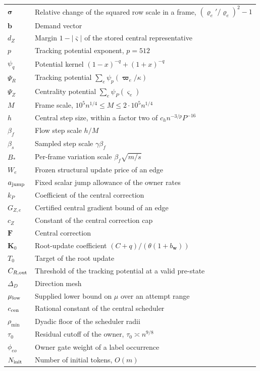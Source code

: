 \documentclass[11pt]{article}
\theoremstyle{remark}
\newcommand{\bb}{\mathbf b}
\newcommand{\ww}{\mathbf w}
\newcommand{\vvs}{\boldsymbol{\varsigma}}
\newcommand{\vvsbar}{\overline{\boldsymbol{\varsigma}}}
\newcommand{\vvr}{\boldsymbol{\varrho}}
\newcommand{\vvp}{\boldsymbol{\varpi}}
\newcommand{\ssigma}{\boldsymbol{\sigma}}
\newcommand{\FF}{\mathbf F}
\newcommand{\KK}{\mathbf K}
\begin{document}
\begin{longtable}{@{}p{}p{}@{}}
$\ssigma$ & Relative change of the squared row scale in a frame, $(\vvr_e'/\vvr_e)^2-1$ \\
$\bb$ & Demand vector \\
$d_Z$ & Margin $1-|\vvsbar|$ of the stored central representative \\
$p$ & Tracking potential exponent, $p=512$ \\
$\psi_q$ & Potential kernel $(1-x)^{-q}+(1+x)^{-q}$ \\
$\Psi_R$ & Tracking potential $\sum_e\psi_p(\vvp_e/\kappa)$ \\
$\Psi_Z$ & Centrality potential $\sum_e\psi_P(\vvs_e)$ \\
$M$ & Frame scale, $10^5n^{1/4}\le M\le2\cdot10^5n^{1/4}$ \\
$h$ & Central step size, within a factor two of $c_hn^{-3/p}P^{-16}$ \\
$\beta_f$ & Flow step scale $h/M$ \\
$\beta_s$ & Sampled step scale $\gamma\beta_f$ \\
$B_*$ & Per-frame variation scale $\beta_f\sqrt{m/s}$ \\
$W_e$ & Frozen structural update price of an edge \\
$a_{\rm jump}$ & Fixed scalar jump allowance of the owner rates \\
$k_P$ & Coefficient of the central correction \\
$G_{Z,e}$ & Certified central gradient bound of an edge \\
$c_Z$ & Constant of the central correction cap \\
$\FF$ & Central correction \\
$\KK_0$ & Root-update coefficient $(C+q)/(\theta(1+b_{\ww}))$ \\
$T_0$ & Target of the root update \\
$C_{R,\rm out}$ & Threshold of the tracking potential at a valid pre-state \\
$\Delta_D$ & Direction mesh \\
$\mu_{\rm low}$ & Supplied lower bound on $\mu$ over an attempt range \\
$c_{\rm cen}$ & Rational constant of the central scheduler \\
$\rho_{\min}$ & Dyadic floor of the scheduler radii \\
$\tau_0$ & Residual cutoff of the owner, $\tau_0\asymp n^{9/8}$ \\
$\phi_{eo}$ & Owner gate weight of a label occurrence \\
$N_{\rm init}$ & Number of initial tokens, $O(m)$ \\

\end{longtable}
\end{document}
